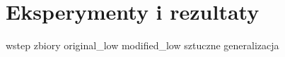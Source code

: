 \chapter{Eksperymenty i rezultaty}

{wstep}
{zbiory}
{original_low}
{modified_low}
{sztuczne}
{generalizacja}


